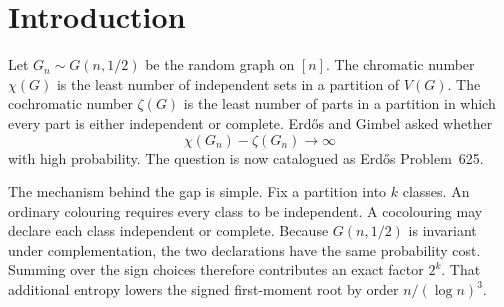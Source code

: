 \section*{Introduction}\label{introduction-reader-first-v2}

Let $G_n\sim G(n,1/2)$ be the random graph on $[n]$.  The chromatic number
$\chi(G)$ is the least number of independent sets in a partition of $V(G)$.
The cochromatic number $\zeta(G)$ is the least number of parts in a partition in
which every part is either independent or complete.  Erd\H{o}s and Gimbel asked
whether
\[
  \chi(G_n)-\zeta(G_n)\longrightarrow\infty
\]
with high probability.  The question is now catalogued as Erd\H{o}s
Problem~625.

The mechanism behind the gap is simple.  Fix a partition into $k$ classes.  An
ordinary colouring requires every class to be independent.  A cocolouring may
declare each class independent or complete.  Because $G(n,1/2)$ is invariant
under complementation, the two declarations have the same probability cost.
Summing over the sign choices therefore contributes an exact factor $2^k$.
That additional entropy lowers the signed first-moment root by order
$n/(\log n)^3$.


